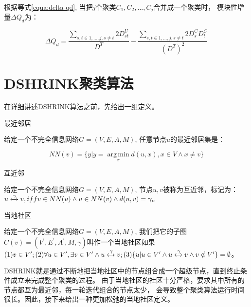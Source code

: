 根据等式\ref{equa:delta-qd}, 当把$j$个聚类$C_1, C_2, ..., C_j$合并成一个聚类时，
模块性增量$\Delta Q_d$为：

\begin{equation}
\label{equa:delta-qd2}
\Delta Q_d = \frac{\sum_{s,t \in {1,...,j}, s \neq t }2D_{st}^U}{D^T} - \frac{\sum_{s,t \in {1,...,j}, s \neq t }2D_s^CD_t^C}{(D^T)^2}
\end{equation}

\section{DSHRINK聚类算法}

在详细讲述DSHRINK算法之前，先给出一组定义。

\begin{defn}{最近邻居}
    \label{defn:nearest-neighbor}

    给定一个不完全信息网络$G = (V, E, A, M)$,
    任意节点$u$的最近邻居集是：

    \begin{equation}
        NN(v) = \{y | y = \operatorname*{arg\,min}_x d(u, x), x \in V \wedge x \neq v\}
    \end{equation}

\end{defn}

\begin{defn}{互近邻}
    \label{defn:mnn}

    给定一个不完全信息网络$G = (V, E, A, M)$,
    节点$u, v$被称为互近邻，标记为：
    $ u \xleftrightarrow{\gamma} v, iff v \in NN(u) \wedge u \in NN(v) \wedge d(u, v) = \gamma$。

\end{defn}

\begin{defn}{当地社区}

    给定一个不完全信息网络$G = (V, E, A, M)$,
    我们把它的子图$C(v) = (V^\prime, E^\prime, A^\prime, M, \gamma)$叫作一个当地社区如果$
    (1) v \in V^\prime;
    (2) \forall u \in V^\prime, \exists v \in V^\prime \wedge u \xleftrightarrow{\gamma} v;
    (3) \{u | u \in V^\prime \wedge u \xleftrightarrow{\gamma} v \wedge v \notin V^\prime \} = \emptyset
    $。
    
\end{defn}

DSHRINK就是通过不断地把当地社区中的节点组合成一个超级节点，直到终止条件成立来完成整个聚类的过程。
由于当地社区的社区十分严格，要求其中所有的节点都互为最近邻，每一轮迭代组合的节点太少，
会导致整个聚类算法运行时间很长。因此，接下来给出一种更加松弛的当地社区定义。

